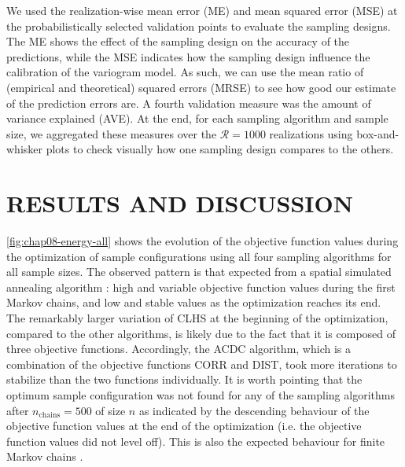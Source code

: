 We used the realization-wise mean error (ME) and mean squared error (MSE) at the probabilistically selected 
validation points to evaluate the sampling designs. The ME shows the effect of the sampling design on the 
accuracy of the predictions, while the MSE indicates how the sampling design influence the calibration of the 
variogram model. As such, we can use the mean ratio of (empirical and theoretical) squared errors (MRSE) to see 
how good our estimate of the prediction errors are.
A fourth validation measure was the amount of variance explained (AVE). At the end, for each sampling algorithm 
and sample size, we aggregated these measures over the $\mathcal{R} = 1000$ realizations using box-and-whisker 
plots to check visually how one sampling design compares to the others.

\section{RESULTS AND DISCUSSION}

\autoref{fig:chap08-energy-all} shows the evolution of the objective function values during the optimization of 
sample configurations using all four sampling algorithms for all sample sizes. The observed pattern is that 
expected from a spatial simulated annealing algorithm \cite{LarkEtAl2003}: high and variable objective function 
values during the first Markov chains, and low and stable values as the optimization reaches its end. The 
remarkably larger variation of CLHS at the beginning of the optimization, compared to the other algorithms, is 
likely due to the fact that it is composed of three objective functions. Accordingly, the ACDC algorithm, which 
is a combination of the objective functions CORR and DIST, took more iterations to stabilize than the two 
functions individually. It is worth pointing that the optimum sample configuration was not found for any of the 
sampling algorithms after $n_\text{chains} = 500$ of size $n$ as indicated by the descending behaviour of the 
objective function values at the end of the optimization (i.e. the objective function values did not level 
off). This is also the expected behaviour for finite Markov chains \cite{WebsterEtAl2013}.

